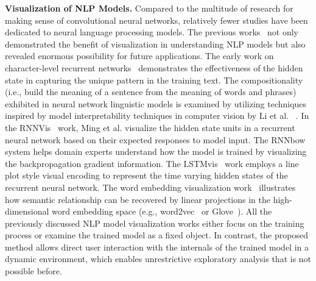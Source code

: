 \textbf{Visualization of NLP Models.}
Compared to the multitude of research for making sense of convolutional neural networks, relatively fewer studies have been dedicated to neural language processing models.
%
The previous works~\cite{KarpathyJohnson2015, LiChenHovy2015, StrobeltGehrmannPfister2018, LiuBremerJayaraman2018} not only demonstrated the benefit of visualization in understanding NLP models but also revealed enormous possibility for future applications.
The early work on character-level recurrent networks~\cite{KarpathyJohnson2015} demonstrates the effectiveness of the hidden state in capturing the unique pattern in the training text. The compositionality (i.e., build the meaning of a sentence from the meaning of words and phrases) exhibited in neural network linguistic models is examined by utilizing techniques inspired by model interpretability techniques in computer vision by Li et al. ~\cite{LiChenHovy2015}.
In the RNNVis~\cite{MingCaoZhang2017} work, Ming et al. visualize the hidden state units in a recurrent neural network based on their expected responses to model input.
The RNNbow~\cite{CashmanPattersonMosca2017} system helps domain experts understand how the model is trained by visualizing the backpropagation gradient information.
The LSTMvis~\cite{StrobeltGehrmannPfister2018} work employs a line plot style visual encoding to represent the time varying hidden states of the recurrent neural network. The word embedding visualization work~\cite{LiuBremerJayaraman2018} illustrates how semantic relationship can be recovered by linear projections in the high-dimensional word embedding space (e.g., word2vec~\cite{MikolovSutskeverChen2013} or Glove~\cite{PenningtonSocherManning2014}).
%
All the previously discussed NLP model visualization works either focus on the training process or examine the trained model as a fixed object. In contrast, the proposed method allows direct user interaction with the internals of the trained model in a dynamic environment, which enables unrestrictive exploratory analysis that is not possible before.

